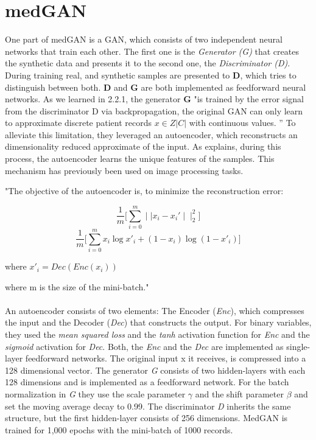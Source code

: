 \documentclass[11pt, a4paper, oneside]{book}
\begin{document}
\section{medGAN}
One part of medGAN is a GAN, which consists of two independent neural networks that train each other. The first one is the \textit{Generator (G)} that creates the synthetic data and presents it to the second one, the \textit{Discriminator (D)}. During training real, and synthetic samples are presented to \textbf{D}, which tries to distinguish between both.
\textbf{D} and \textbf{G} are both implemented as feedforward neural networks.
As we learned in 2.2.1, the generator \textbf{G} "is trained by the error signal from the discriminator D via backpropagation, the original GAN can only learn to approximate discrete patient records $x \in Z|C|$ with continuous values. ” \citep{Choi2017}
To alleviate this limitation, they leveraged an autoencoder, which reconstructs an dimensionality reduced approximate of the input. As \citep{Choi2017} explains, during this process, the autoencoder learns the unique features of the samples. This mechanism has previously been used on image processing tasks.

"The objective of the autoencoder is, to minimize the reconstruction error:

\begin{equation}
\frac{1}{m}\big[\sum_{i=0}^m \mid\mid x_i - x_i'\mid\mid_2^2]
\end{equation}
\begin{equation}
\frac{1}{m}\big[\sum_{i=0}^m x_i \log x'_i + (1-x_i) \log (1-x'_i)]
\end{equation} 
\begin{center}
where $x'_i = Dec(Enc(x_i))$
\end{center}

where m is the size of the mini-batch." \citep{Choi2017}
\\
\\
An autoencoder consists of two elements: The Encoder (\textit{Enc}), which compresses the input and the Decoder (\textit{Dec}) that constructs the output.
For binary variables, they used the \textit{mean squared loss} and the \textit{tanh} activation function for \textit{Enc} and the \textit{sigmoid} activation for \textit{Dec}.
Both, the \textit{Enc} and the \textit{Dec} are implemented as single-layer feedforward networks. The original input x it receives, is compressed into a 128 dimensional vector. The generator \textit{G} consists of two hidden-layers with each 128 dimensions and is implemented as a feedforward network. For the batch normalization in \textit{G} they use the scale parameter  $\gamma$ and the shift parameter $\beta$ and set the moving average decay to 0.99. The discriminator \textit{D} inherits the same structure, but the first hidden-layer consists of 256 dimensions. MedGAN is trained for 1,000 epochs with the mini-batch of 1000 records. \citep{Choi2017}
\end{document}
